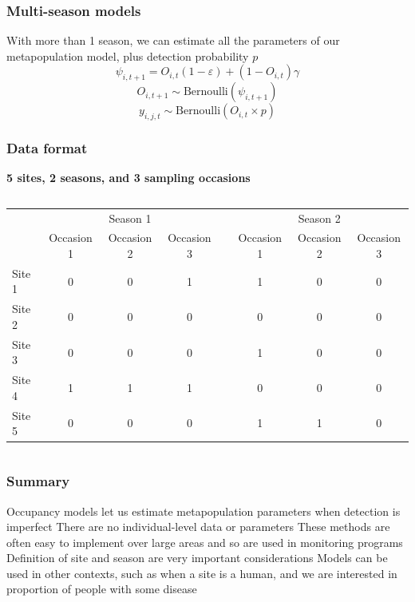 \documentclass[color=usenames,dvipsnames]{beamer}\usepackage[]{graphicx}\usepackage[]{color}
\begin{document}
\begin{frame}
  \frametitle{Multi-season models}
  \Large
  With more than 1 season, we can estimate all the parameters of our
  metapopulation model, plus detection probability $p$
  \pause
  \[
    \psi_{i,t+1} = O_{i,t}(1-\varepsilon) + (1-O_{i,t})\gamma
  \]
  \[
    O_{i,t+1} \sim \mbox{Bernoulli}(\psi_{i,t+1})
  \]
  \[
    y_{i,j,t} \sim \mathrm{Bernoulli}(O_{i,t} \times p)
  \]
\end{frame}




\begin{frame}
  \frametitle{Data format}
  {\bf \centering \large 5 sites, 2 seasons, and 3 sampling occasions \par}
  \vspace{0.3cm}
  \begin{columns}
    \column{\dimexpr\paperwidth-10pt}
    \scriptsize
      \begin{tabular}{lccccccc}
        \hline
        & \multicolumn{3}{c}{Season 1} & &
        \multicolumn{3}{c}{Season 2} \\
        \cline{2-4} \cline{6-8}
        & Occasion 1 & Occasion 2 & Occasion 3 & & Occasion 1 & Occasion 2 & Occasion 3 \\
        \hline
        Site 1 & 0 & 0 & 1 & & 1 & 0 & 0 \\
        Site 2 & 0 & 0 & 0 & & 0 & 0 & 0 \\
        Site 3 & 0 & 0 & 0 & & 1 & 0 & 0 \\
        Site 4 & 1 & 1 & 1 & & 0 & 0 & 0 \\
        Site 5 & 0 & 0 & 0 & & 1 & 1 & 0 \\
        \hline
      \end{tabular}
  \end{columns}
\end{frame}




\begin{frame}
  \frametitle{Summary}
  \large
  Occupancy models let us estimate metapopulation parameters
      when detection is imperfect
\pause
\vfill
      There are no individual-level data or parameters
\pause
\vfill
      These methods are often easy to implement over large areas
      and so are used in monitoring programs
\pause
\vfill
      Definition of site and season are very important considerations
\pause
\vfill
      Models can be used in other contexts, such as when a site is
      a human, and we are interested in proportion of people with some disease
\end{frame}
\end{document}
